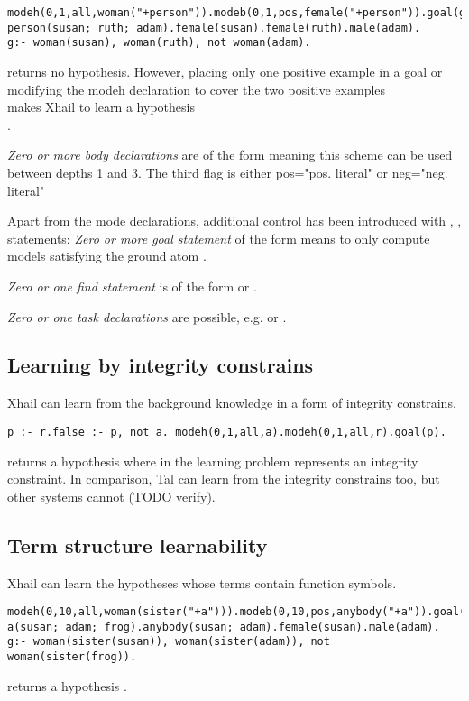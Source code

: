 \begin{lstlisting}
modeh(0,1,all,woman("+person")).modeb(0,1,pos,female("+person")).goal(g).
person(susan; ruth; adam).female(susan).female(ruth).male(adam).
g:- woman(susan), woman(ruth), not woman(adam).
\end{lstlisting}
returns no hypothesis. However, placing only one positive example in a goal
 or modifying the modeh declaration to cover the two positive examples\\
 makes Xhail to learn a hypothesis\\
.

\emph{Zero or more body declarations} are of the form  meaning this scheme can be used between 
 depths 1 and 3.  The third flag is either pos="pos. literal" or neg="neg. literal" 

Apart from the mode declarations, additional control has been introduced with , ,  statements:
\emph{Zero or more goal statement} of the form  means to only compute models satisfying the ground atom .

\emph{Zero or one find statement} is of the form  or .

\emph{Zero or one task declarations} are possible, e.g.  or .

\subsection{Learning by integrity constrains}
Xhail can learn from the background knowledge in a form of integrity constrains.
\begin{lstlisting}
p :- r.false :- p, not a. modeh(0,1,all,a).modeh(0,1,all,r).goal(p).
\end{lstlisting}
returns a hypothesis  where in the learning problem
 represents an integrity constraint. In comparison, Tal can learn from the integrity constrains too, but other systems cannot (TODO verify).

\subsection{Term structure learnability}
Xhail can learn the hypotheses whose terms contain function symbols.
\begin{lstlisting}
modeh(0,10,all,woman(sister("+a"))).modeb(0,10,pos,anybody("+a")).goal(g).
a(susan; adam; frog).anybody(susan; adam).female(susan).male(adam).
g:- woman(sister(susan)), woman(sister(adam)), not woman(sister(frog)).
\end{lstlisting}
returns a hypothesis
.
